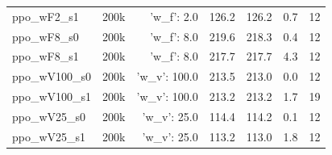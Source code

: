 \begin{longtable}{llrrrrr}
ppo\_wF2\_s1 & 200k & {'w\_f': 2.0} & 126.2 & 126.2 & 0.7 & 12 \\
ppo\_wF8\_s0 & 200k & {'w\_f': 8.0} & 219.6 & 218.3 & 0.4 & 12 \\
ppo\_wF8\_s1 & 200k & {'w\_f': 8.0} & 217.7 & 217.7 & 4.3 & 12 \\
ppo\_wV100\_s0 & 200k & {'w\_v': 100.0} & 213.5 & 213.0 & 0.0 & 12 \\
ppo\_wV100\_s1 & 200k & {'w\_v': 100.0} & 213.2 & 213.2 & 1.7 & 19 \\
ppo\_wV25\_s0 & 200k & {'w\_v': 25.0} & 114.4 & 114.2 & 0.1 & 12 \\
ppo\_wV25\_s1 & 200k & {'w\_v': 25.0} & 113.2 & 113.0 & 1.8 & 12 \\
\bottomrule
\end{longtable}
